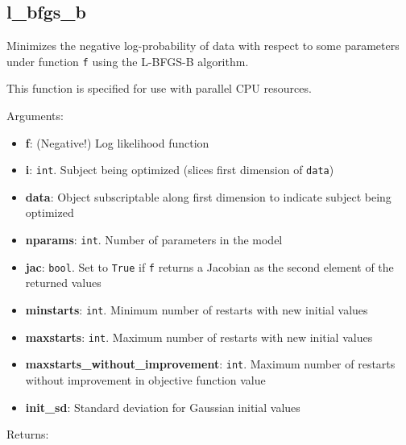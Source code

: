 \subsection{l\_bfgs\_b}\label{l_bfgs_b}

\begin{Shaded}
\begin{Highlighting}[]
\OperatorTok{=}\OperatorTok{=}\OperatorTok{=}\OperatorTok{=}\NormalTok{)}
\end{Highlighting}
\end{Shaded}

Minimizes the negative log-probability of data with respect to some
parameters under function \texttt{f} using the L-BFGS-B algorithm.

This function is specified for use with parallel CPU resources.

Arguments:

\begin{itemize}
\tightlist
\item
  \textbf{f}: (Negative!) Log likelihood function
\item
  \textbf{i}: \texttt{int}. Subject being optimized (slices first
  dimension of \texttt{data})
\item
  \textbf{data}: Object subscriptable along first dimension to indicate
  subject being optimized
\item
  \textbf{nparams}: \texttt{int}. Number of parameters in the model
\item
  \textbf{jac}: \texttt{bool}. Set to \texttt{True} if \texttt{f}
  returns a Jacobian as the second element of the returned values
\item
  \textbf{minstarts}: \texttt{int}. Minimum number of restarts with new
  initial values
\item
  \textbf{maxstarts}: \texttt{int}. Maximum number of restarts with new
  initial values
\item
  \textbf{maxstarts\_without\_improvement}: \texttt{int}. Maximum number
  of restarts without improvement in objective function value
\item
  \textbf{init\_sd}: Standard deviation for Gaussian initial values
\end{itemize}

Returns:

